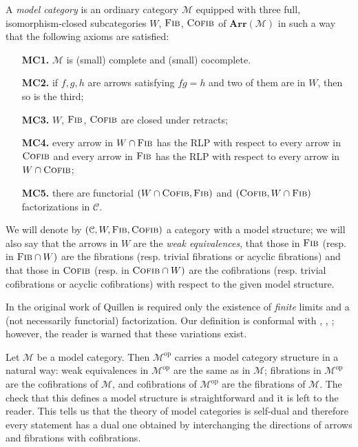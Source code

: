 \begin{refsection}
\begin{defin}
A \emph{model category} is an ordinary category $\mathcal M$ equipped with three full, isomorphism-closed subcategories $W$, $\textsc{Fib}$, $\textsc{Cofib}$ of $\mathbf{Arr}(\mathcal M)$ in such a way that the following axioms are satisfied:
\begin{itemize}[leftmargin = 1.4 cm]
\item[{\bfseries MC1.}] $\mathcal M$ is (small) complete and (small) cocomplete.
\item[{\bfseries MC2.}] if $f,g,h$ are arrows satisfying $fg = h$ and two of them are in $W$, then so is the third;
\item[{\bfseries MC3.}] $W$, $\textsc{Fib}$, $\textsc{Cofib}$ are closed under retracts;
\item[{\bfseries MC4.}] every arrow in $W \cap \textsc{Fib}$ has the RLP with respect to every arrow in $\textsc{Cofib}$ and every arrow in $\textsc{Fib}$ has the RLP with respect to every arrow in $W \cap \textsc{Cofib}$;
\item[{\bfseries MC5.}] there are functorial $(W \cap \textsc{Cofib}, \textsc{Fib})$ and $(\textsc{Cofib}, W \cap \textsc{Fib})$ factorizations in $\mathcal C$.
\end{itemize}
We will denote by $(\mathcal C, W,\textsc{Fib},\textsc{Cofib})$ a category with a model structure; we will also say that the arrows in $W$ are the \emph{weak equivalences}, that those in $\textsc{Fib}$ (resp. in $\textsc{Fib} \cap W)$ are the fibrations (resp. trivial fibrations or acyclic fibrations) and that those in $\textsc{Cofib}$ (resp. in $\textsc{Cofib} \cap W)$ are the cofibrations (resp. trivial cofibrations or acyclic cofibrations) with respect to the given model structure.
\end{defin}

\begin{rmk}
In the original work of Quillen \cite{quillen} is required only the existence of \emph{finite} limits and a (not necessarily functorial) factorization. Our definition is conformal with \cite{hovey}, \cite{hirschhorn}, \cite{dhk}; however, the reader is warned that these variations exist.
\end{rmk}

\begin{eg}
Let $\mathcal M$ be a model category. Then $\mathcal M^\mathrm{op}$ carries a model category structure in a natural way: weak equivalences in $\mathcal M^\mathrm{op}$ are the same as in $\mathcal M$; fibrations in $\mathcal M^\mathrm{op}$ are the cofibrations of $\mathcal M$, and cofibrations of $\mathcal M^\mathrm{op}$ are the fibrations of $\mathcal M$. The check that this defines a model structure is straightforward and it is left to the reader. This tells us that the theory of model categories is self-dual and therefore every statement has a dual one obtained by interchanging the directions of arrows and fibrations with cofibrations.
\end{eg}


\end{refsection}
